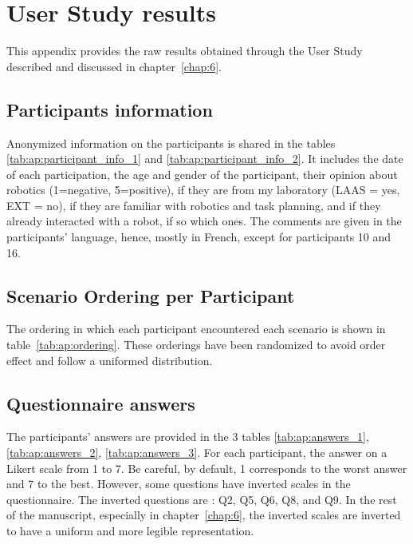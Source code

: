 \cleardoublepage

\chapter{User Study results}
\label{ap:study}

This appendix provides the raw results obtained through the User Study described and discussed in chapter~\ref{chap:6}.

\section{Participants information}

Anonymized information on the participants is shared in the tables \ref{tab:ap:participant_info_1} and \ref{tab:ap:participant_info_2}. It includes the date of each participation, the age and gender of the participant, their opinion about robotics (1=negative, 5=positive), if they are from my laboratory (LAAS = yes, EXT = no), if they are familiar with robotics and task planning, and if they already interacted with a robot, if so which ones. The comments are given in the participants' language, hence, mostly in French, except for participants 10 and 16. 

\section{Scenario Ordering per Participant}

The ordering in which each participant encountered each scenario is shown in table~\ref{tab:ap:ordering}. These orderings have been randomized to avoid order effect and follow a uniformed distribution.

\section{Questionnaire answers}

The participants' answers are provided in the 3 tables \ref{tab:ap:answers_1}, \ref{tab:ap:answers_2}, \ref{tab:ap:answers_3}. For each participant, the answer on a
Likert scale from 1 to 7. Be careful, by default, 1 corresponds to the worst answer and 7 to the best. However, some questions have inverted scales in the questionnaire. The inverted questions are : Q2, Q5, Q6, Q8, and Q9. In the rest of the manuscript, especially in chapter~\ref{chap:6}, the inverted scales are inverted to have a uniform and more legible representation. 

